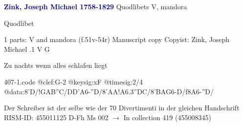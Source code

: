 \documentclass[twocolumn]{book}
\begin{document}
\newline \par \vspace{7pt} \textcolor{darkblue}{\textbf{Zink, Joseph Michael  1758-1829}}
\newline Quodlibets
\newline V, mandora
\newline \begin{itshape}[heading, f.51v:] Quodlibet\end{itshape} 
\newline \textcolor{darkblue}{}  1 parts: V and mandora  (f.51v-54r)
\newline Manuscript copy
\newline Copyist: Zink, Joseph Michael
.1  V  G
\newline \begin{footnotesize} Zu nachts wenn alles schlafen liegt \end{footnotesize}  
\begin{filecontents*}{407-1.code}
@clef:G-2
@keysig:xF
@timesig:2/4
@data:8'D/!GAB''C/DD'A6-''D/8'AA!{A6.3''DC}/8'BAG6-D/f8A6-''D/
\end{filecontents*}
\newline
%

\newline Der Schreiber ist der selbe wie der 70 Divertimenti in der gleichen Handschrift
\newline RISM-ID: 455011125
\newline D-Fh  Ms 002
\newline $\rightarrow$ In collection 419 (455008345)
      
\end{document}
